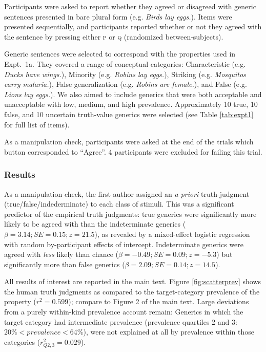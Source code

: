 \documentclass[10pt,letterpaper]{article}
\begin{document}
Participants were asked to report whether they agreed or disagreed with generic sentences presented in bare plural form (e.g. \emph{Birds lay eggs.}). 
Items were presented sequentially, and participants reported whether or not they agreed with the sentence by pressing either \textsc{p} or \textsc{q} (randomized between-subjects). 

Generic sentences were selected to correspond with the properties used in Expt.~1a. 
They covered a range of conceptual categories: Characteristic (e.g. \emph{Ducks have wings.}), Minority (e.g. \emph{Robins lay eggs.}), Striking (e.g. \emph{Mosquitos carry malaria.}), False generalization (e.g. \emph{Robins are female.}), and False (e.g. \emph{Lions lay eggs.}).
We also aimed to include generics that were both acceptable and unacceptable with low, medium, and high prevalence.
Approximately 10 true, 10 false, and 10 uncertain truth-value generics were selected (see Table \ref{tab:expt1} for full list of items).

As a manipulation check, participants were asked at the end of the trials which button corresponded to ``Agree''. 4 participants were excluded for failing this trial.

\subsubsection{Results}

As a manipulation check, the first author assigned an \emph{a priori} truth-judgment (true/false/indederminate) to each class of stimuli. This was a significant predictor of the empirical truth judgments: true generics were significantly more likely to be agreed with than the indeterminate generics ($\beta = 3.14; SE = 0.15; z = 21.5$), as revealed by a mixed-effect logistic regression with random by-participant effects of intercept.
Indeterminate generics were agreed with \emph{less} likely than chance ($\beta = -0.49; SE = 0.09; z = -5.3$) but significantly more than false generics ($\beta = 2.09; SE = 0.14; z = 14.5$).


All results of interest are reported in the main text.
 Figure \ref{fig:scatterprev} shows the human truth judgments as compared to the target-category prevalence of the property ($r^2 = 0.599$); compare to Figure 2 of the main text.
 Large deviations from a purely within-kind prevalence account remain: 
 Generics in which the target category had intermediate prevalence (prevalence quartiles 2 and 3: $ 20\% < prevalence < 64\%$), were not explained at all by prevalence within those categories ($r_{Q2,3}^2 = 0.029$).
\end{document}
